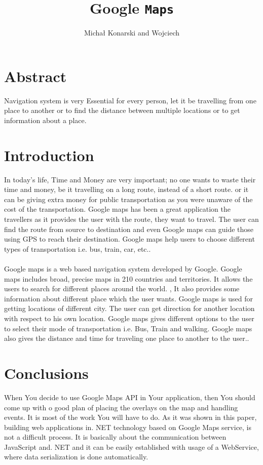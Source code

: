 \documentclass[a4paper,10pt]{article}
\title{Google \texttt{Maps} }
\author{Michał Konarski and Wojciech}
\begin{document}
	
	\maketitle
	

\section*{Abstract}
Navigation system is very Essential for every person, let it be travelling from one place to another or to find the distance between multiple locations or to get information about a place.\cite{GoogleAPI,Washington}
\section*{Introduction}
In today's life, Time and Money are very important; no one wants to waste their time and money, be it travelling on a long route, instead of a short route. or it can be giving extra money for public transportation as you were unaware of the cost of the transportation. Google maps has been a great application the travellers as it provides the user with the route, they want to travel. The user can find the route from source to destination and even Google maps can guide those using GPS to reach their destination. Google maps help users to choose different types of transportation i.e. bus, train, car, etc..\cite{GoogleAPI}
\paragraph{}

Google maps is a web based navigation system developed by Google. Google maps includes broad, precise maps in 210 countries and territories. It allows the users to search for different places around the world. \cite{GoogleAPI}, It also provides some information about different place which the user wants. Google maps is used for getting locations of different city. The user can get direction for another location with respect to his own location. Google maps gives different options to the user to select their mode of transportation i.e. Bus, Train and walking. Google maps also gives the distance and time for traveling one place to another to the user..\cite{Brisbane}


\section*{Conclusions}
When You decide to use Google Maps API in Your application, then You should come up with o good plan of placing the overlays on the map and handling events. It is most of the work You will have to do. As it was shown in this paper, building web applications in.\cite{Ijarcce} NET technology based on Google Maps service, is not a difficult process. It is basically about the communication between JavaScript\cite{Springer} and. NET and it can be easily established with usage of a WebService, where data serialization is done automatically.\cite{Doe:2009:Online}


	
	\medskip
	
	
	
\end{document}
